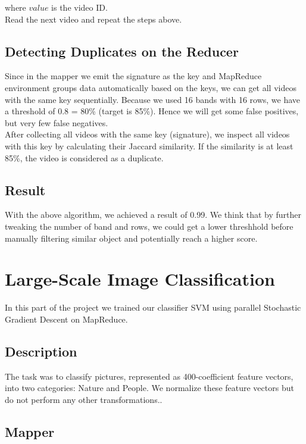 \documentclass[a4paper, 11pt]{article}
\begin{document}
                where $value$ is the video ID.\\
                Read the next video and repeat the steps above.
                
        \subsection{Detecting Duplicates on the Reducer}
                Since in the mapper we emit the signature as the key and MapReduce environment groups data automatically based on the keys, we can get all videos with the same key sequentially. Because we used 16 bands with 16 rows, we have a threshold of 0.8 = 80\% (target is 85\%). Hence we will get some false positives, but very few false negatives.\\

                After collecting all videos with the same key (signature), we inspect all videos with this key by calculating their Jaccard similarity. If the similarity is at least 85\%, the video is considered as a duplicate.

        \subsection{Result}
                With the above algorithm, we achieved a result of 0.99. We think that by further tweaking the number of band and rows, we could get a lower threshhold before manually filtering similar object and potentially reach a higher score.
\pagebreak

\section{Large-Scale Image Classification}

In this part of the project we trained our classifier SVM using parallel Stochastic Gradient Descent on MapReduce. 

\subsection{Description}

The task was to classify pictures, represented as 400-coefficient feature vectors, into two categories: Nature and People. We normalize these feature vectors but do not perform any other transformations..

\subsection{Mapper}
\end{document}
